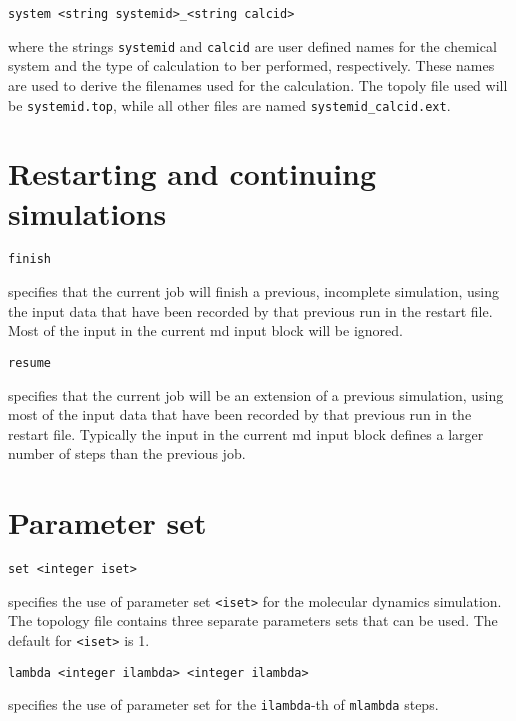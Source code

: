 \begin{verbatim}
system <string systemid>_<string calcid>
\end{verbatim}

where the strings \verb+systemid+ and \verb+calcid+ are user defined names
for the chemical system and the type of calculation to ber performed, 
respectively. These names are used to derive the filenames used for the
calculation. The topoly file used will be \verb+systemid.top+, while all
other files are named \verb+systemid_calcid.ext+.

\section{Restarting and continuing simulations}
\begin{description}
\item
\begin{verbatim}
finish
\end{verbatim}
specifies that the current job will finish a previous, incomplete
simulation, using the input data that have been recorded by that
previous run in the restart file. Most of the input in the current
md input block will be ignored.

\item
\begin{verbatim}
resume
\end{verbatim}
specifies that the current job will be an extension of a previous
simulation, using most of the  input data that have been recorded by that
previous run in the restart file. Typically the input in the current
md input block defines a larger number of steps than the previous job.

\section{Parameter set}

\item
\begin{verbatim}
set <integer iset>
\end{verbatim}
specifies the use of parameter set \verb+<iset>+ for the 
molecular dynamics simulation. 
The topology file contains three separate parameters sets that can 
be used. The default for \verb+<iset>+ is 1.

\item
\begin{verbatim}
lambda <integer ilambda> <integer ilambda>
\end{verbatim}
specifies the use of parameter set for the \verb+ilambda+-th
of \verb+mlambda+ steps.


\end{description}
